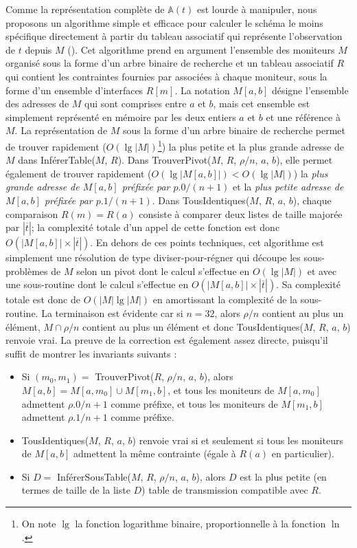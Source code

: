Comme la représentation complète de ${\mathbb A}(t)$ est lourde à manipuler,
nous proposons un algorithme simple et efficace pour calculer le schéma le moins
spécifique directement à partir du tableau associatif qui représente
l'observation de $t$ depuis $M$ ().
Cet algorithme prend en argument l'ensemble des moniteurs $M$ organisé sous la
forme d'un arbre binaire de recherche et un tableau associatif $R$ qui contient
les contraintes fournies par \udpping associées à chaque moniteur, sous la forme
d'un ensemble d'interfaces $R[m]$. La notation $M[a,b]$ désigne l'ensemble des
adresses de $M$ qui sont comprises entre $a$ et $b$, mais cet ensemble est
simplement représenté en mémoire par les deux entiers $a$ et $b$ et une
référence à $M$. La représentation de $M$ sous la forme d'un arbre binaire de
recherche permet de trouver rapidement ($O(\lg |M|)$\footnote{On note $\lg$ la
fonction logarithme binaire, proportionnelle à la fonction $\ln$.}) la plus
petite et la plus grande adresse de $M$ dans {\sc InférerTable}($M$, $R$). Dans
{\sc TrouverPivot}($M$, $R$, $\rho/n$, $a$, $b$), elle permet également de
trouver rapidement ($O(\lg |M[a, b]|) < O(\lg |M|)$) la {\em plus grande adresse
de $M[a, b]$ préfixée par $p.0/(n+1)$} et la {\em plus petite adresse de $M[a,
b]$ préfixée par $p.1/(n+1)$}. Dans {\sc TousIdentiques}($M$, $R$, $a$, $b$),
chaque comparaison $R(m) = R(a)$ consiste à comparer deux listes de taille
majorée par $|\overline{t}|$; la complexité totale d'un appel de cette fonction
est donc $O(|M[a,b]| \times |\overline{t}|)$. En dehors de ces points
techniques, cet algorithme est simplement une résolution de type
diviser-pour-régner qui découpe les sous-problèmes de $M$ selon un pivot dont
le calcul s'effectue en $O(\lg |M|)$ et avec une sous-routine dont le calcul
s'effectue en $O(|M[a,b]| \times |\overline{t}|)$. Sa complexité totale est donc
de $O(|M| \lg |M|)$ en amortissant la complexité de la sous-routine. La
terminaison est évidente car si $n = 32$, alors $\rho/n$ contient au plus un
élément, \afortiori $M \cap \rho/n$ contient au plus un élément et donc {\sc
TousIdentiques}($M$, $R$, $a$, $b$) renvoie vrai. La preuve de la correction est
également assez directe, puisqu'il suffit de montrer les invariants suivants :
\begin{itemize}
  \item Si $(m_0, m_1) =$ {\sc TrouverPivot}($R$, $\rho/n$, $a$, $b$), alors
  $M[a,b] = M[a, m_0] \cup M[m_1, b]$, et tous les moniteurs de $M[a, m_0]$
  admettent $\rho.0/n+1$ comme préfixe, et tous les moniteurs de $M[m_1, b]$
  admettent $\rho.1/n+1$ comme préfixe.
  \item {\sc TousIdentiques}($M$, $R$, $a$, $b$) renvoie {\sc vrai} si et
  seulement si tous les moniteurs de $M[a, b]$ admettent la même contrainte
  (égale à $R(a)$ en particulier).
  \item Si $D =$ {\sc InférerSousTable}($M$, $R$, $\rho/n$, $a$, $b$), alors $D$
  est la plus petite (en termes de taille de la liste $D$) table de transmission
  compatible avec $R$.
\end{itemize}

